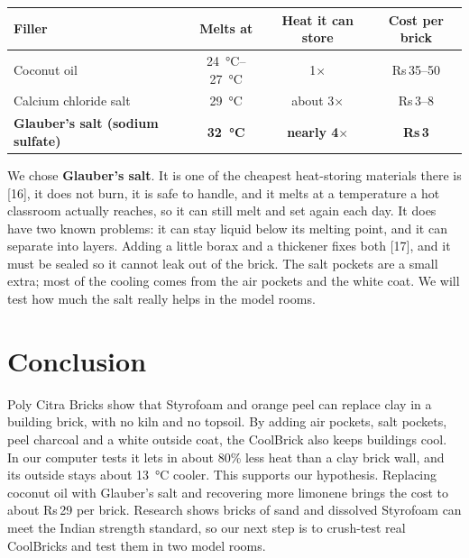 \documentclass[11pt,a4paper]{article}
\providecommand{\rupee}{Rs}
\let\origsection\section
\renewcommand{\section}{\clearpage\origsection}
\begin{document}
\begin{center}
\begin{tabularx}{\textwidth}{@{}X c c c@{}}
\toprule
Filler & Melts at & Heat it can store & Cost per brick \\
\midrule
Coconut oil & \SI{24}{\celsius}--\SI{27}{\celsius} & 1$\times$ & \rupee\,35--50 \\
Calcium chloride salt & \SI{29}{\celsius} & about 3$\times$ & \rupee\,3--8 \\
\textbf{Glauber's salt (sodium sulfate)} & \textbf{\SI{32}{\celsius}} & \textbf{nearly 4$\times$} & \textbf{\rupee\,3} \\
\bottomrule
\end{tabularx}
\end{center}

We chose \textbf{Glauber's salt}. It is one of the cheapest heat-storing
materials there is [16], it does not burn, it is safe to handle, and it melts
at a temperature a hot classroom actually reaches, so it can still melt and
set again each day. It does have two known problems: it can stay liquid
below its melting point, and it can separate into layers. Adding a little
borax and a thickener fixes both [17], and it must be sealed so it cannot
leak out of the brick. The salt pockets are a small extra; most of the
cooling comes from the air pockets and the white coat. We will test how much
the salt really helps in the model rooms.

\section{Conclusion}

Poly Citra Bricks show that Styrofoam and orange peel can replace clay in a
building brick, with no kiln and no topsoil. By adding air pockets,
salt pockets, peel charcoal and a white outside coat, the CoolBrick
also keeps buildings cool. In our computer tests it lets in about
80\% less heat than a clay brick wall, and its outside stays about
\SI{13}{\celsius} cooler. This supports our hypothesis. Replacing coconut oil with Glauber's salt and
recovering more limonene brings the cost to about \rupee\,29 per brick. Research shows bricks of sand and dissolved Styrofoam can
meet the Indian strength standard, so our next step is to crush-test real
CoolBricks and test them in two model rooms.
\end{document}
